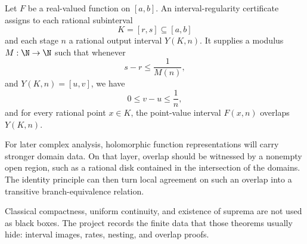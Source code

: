 \begin{definition}\label{def:interval-regular}
Let \(F\) be a real-valued function on \([a,b]\).  An interval-regularity
certificate assigns to each rational subinterval
\[
  K=[r,s]\subseteq [a,b]
\]
and each stage \(n\) a rational output interval \(Y(K,n)\).  It supplies a
modulus \(M:\N\to\N\) such that whenever
\[
  s-r\le \frac{1}{M(n)},
\]
and \(Y(K,n)=[u,v]\), we have
\[
  0\le v-u\le \frac{1}{n},
\]
and for every rational point \(x\in K\), the point-value interval
\(F(x,n)\) overlaps \(Y(K,n)\).
\end{definition}

\begin{remark}\label{rem:holomorphic-branch-equivalence}
For later complex analysis, holomorphic function representations will carry
stronger domain data.  On that layer, overlap should be witnessed by a
nonempty open region, such as a rational disk contained in the intersection of
the domains.  The identity principle can then turn local agreement on such an
overlap into a transitive branch-equivalence relation.
\end{remark}

\begin{remark}\label{rem:completeness-replaced-by-moduli}
Classical compactness, uniform continuity, and existence of suprema are not
used as black boxes.  The project records the finite data that those theorems
usually hide: interval images, rates, nesting, and overlap proofs.
\end{remark}
